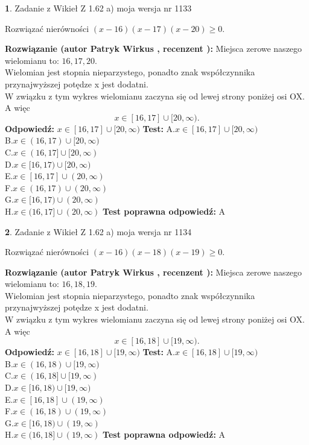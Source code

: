 \documentclass[12pt, a4paper]{article}
\theoremstyle{definition} %
\newtheorem{zad}{}
\newcommand{\zadStart}[1]{\begin{zad}#1\newline}
\newcommand{\zadStop}{\end{zad}}
\newcommand{\rozwStart}[2]{\noindent \textbf{Rozwiązanie (autor #1 , recenzent #2): }\newline}
\newcommand{\rozwStop}{\newline}
\newcommand{\odpStart}{\noindent \textbf{Odpowiedź:}\newline}
\newcommand{\odpStop}{\newline}
\newcommand{\testStart}{\noindent \textbf{Test:}\newline}
\newcommand{\testStop}{\newline}
\newcommand{\kluczStart}{\noindent \textbf{Test poprawna odpowiedź:}\newline}
\newcommand{\kluczStop}{\newline}
\begin{document}
\zadStart{Zadanie z Wikieł Z 1.62 a) moja wersja nr 1133}

Rozwiązać nierówności $(x-16)(x-17)(x-20)\ge0$.
\zadStop
\rozwStart{Patryk Wirkus}{}
Miejsca zerowe naszego wielomianu to: $16, 17, 20$.\\
Wielomian jest stopnia nieparzystego, ponadto znak współczynnika przy\linebreak najwyższej potędze x jest dodatni.\\ W związku z tym wykres wielomianu zaczyna się od lewej strony poniżej osi OX. A więc $$x \in [16,17] \cup [20,\infty).$$
\rozwStop
\odpStart
$x \in [16,17] \cup [20,\infty)$
\odpStop
\testStart
A.$x \in [16,17] \cup [20,\infty)$\\
B.$x \in (16,17) \cup [20,\infty)$\\
C.$x \in (16,17] \cup [20,\infty)$\\
D.$x \in [16,17) \cup [20,\infty)$\\
E.$x \in [16,17] \cup (20,\infty)$\\
F.$x \in (16,17) \cup (20,\infty)$\\
G.$x \in [16,17) \cup (20,\infty)$\\
H.$x \in (16,17] \cup (20,\infty)$
\testStop
\kluczStart
A
\kluczStop



\zadStart{Zadanie z Wikieł Z 1.62 a) moja wersja nr 1134}

Rozwiązać nierówności $(x-16)(x-18)(x-19)\ge0$.
\zadStop
\rozwStart{Patryk Wirkus}{}
Miejsca zerowe naszego wielomianu to: $16, 18, 19$.\\
Wielomian jest stopnia nieparzystego, ponadto znak współczynnika przy\linebreak najwyższej potędze x jest dodatni.\\ W związku z tym wykres wielomianu zaczyna się od lewej strony poniżej osi OX. A więc $$x \in [16,18] \cup [19,\infty).$$
\rozwStop
\odpStart
$x \in [16,18] \cup [19,\infty)$
\odpStop
\testStart
A.$x \in [16,18] \cup [19,\infty)$\\
B.$x \in (16,18) \cup [19,\infty)$\\
C.$x \in (16,18] \cup [19,\infty)$\\
D.$x \in [16,18) \cup [19,\infty)$\\
E.$x \in [16,18] \cup (19,\infty)$\\
F.$x \in (16,18) \cup (19,\infty)$\\
G.$x \in [16,18) \cup (19,\infty)$\\
H.$x \in (16,18] \cup (19,\infty)$
\testStop
\kluczStart
A
\kluczStop
\end{document}

